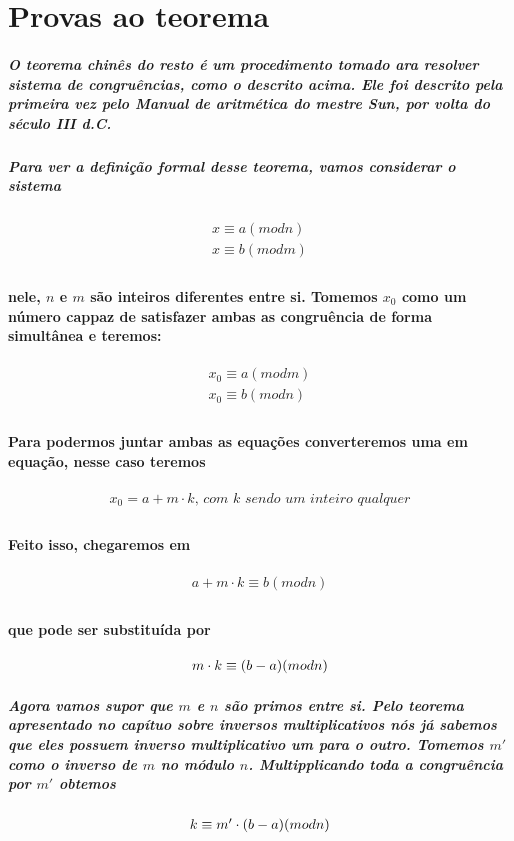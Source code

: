 \section{Provas ao teorema}

\subparagraph{
O teorema chin\^es do resto \'e um procedimento tomado ara resolver sistema de congru\^encias, como o descrito acima. Ele foi descrito pela primeira vez pelo Manual de aritm\'etica do mestre Sun, por volta do s\'eculo III d.C. 
}
\subparagraph{
Para ver a defini\c{c}\~ao formal desse teorema, vamos considerar o sistema
}
\[	
	\begin{array}{c}
		\textit{$x \equiv a (mod n)$}\\
		\textit{$x \equiv b (mod m)$}\\
	\end{array}
\]
\paragraph{
nele, $n$ e $m$ s\~ao inteiros diferentes entre si. Tomemos $x_0$ como um n\'umero cappaz de satisfazer ambas as congru\^encia de forma simult\^anea e teremos:
}
\[	
	\begin{array}{c}
		\textit{$x_0 \equiv a (mod m)$}\\
		\textit{$x_0 \equiv b (mod n)$}\\
	\end{array}
\]
\paragraph{
Para podermos juntar ambas as equa\c{c}\~oes converteremos uma em equa\c{c}\~ao, nesse caso teremos 
}
\[	
	\begin{array}{c}
		\textit{$x_0 = a + m\cdot k$, com $k$ sendo um inteiro qualquer}\\
	\end{array}
\]
\paragraph{
Feito isso, chegaremos em
}
\[	
	\begin{array}{c}
		\textit{$a + m\cdot k \equiv b (mod n)$}\\
	\end{array}
\]
\paragraph{
que pode ser substitu\'ida por
}
\[	
	\begin{array}{c}
		\textit{$ m\cdot k \equiv (b-a) (mod n)$}\\
	\end{array}
\]
\subparagraph{
Agora vamos supor que $m$ e $n$ s\~ao primos entre si. Pelo teorema apresentado no cap\'ituo sobre inversos multiplicativos n\'os j\'a sabemos que eles possuem inverso multiplicativo um para o outro. Tomemos $m'$ como o inverso de $m$ no m\'odulo $n$. Multipplicando toda a congru\^encia por $m'$ obtemos
}
\[	
	\begin{array}{c}
		\textit{$ k \equiv m'\cdot(b-a) (mod n)$}\\
	\end{array}
\]
